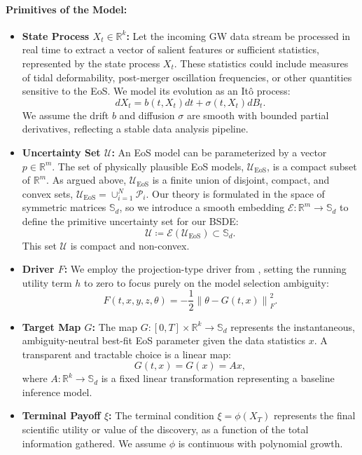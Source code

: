 \documentclass[12pt, letterpaper]{amsart}
\newcommand{\Ucal}{\mathcal{U}}
\newcommand{\Sd}{\mathbb{S}_d}
\newcommand{\R}{\mathbb{R}}
\newcommand{\norm}[1]{\left\lVert#1\right\rVert}
\theoremstyle{plain}
\theoremstyle{definition}
\theoremstyle{remark}
\numberwithin{equation}{section} %
\begin{document}
\paragraph{\textbf{Primitives of the Model:}}
\begin{itemize}
    \item \textbf{State Process $X_t \in \R^k$:} Let the incoming GW data stream be processed in real time to extract a vector of salient features or sufficient statistics, represented by the state process $X_t$. These statistics could include measures of tidal deformability, post-merger oscillation frequencies, or other quantities sensitive to the EoS. We model its evolution as an Itô process:
    \[ dX_t = b(t, X_t) dt + \sigma(t, X_t) dB_t. \]
    We assume the drift $b$ and diffusion $\sigma$ are smooth with bounded partial derivatives, reflecting a stable data analysis pipeline.

    \item \textbf{Uncertainty Set $\Ucal$:} An EoS model can be parameterized by a vector $p \in \R^m$. The set of physically plausible EoS models, \(\Ucal_{\text{EoS}}\), is a compact subset of $\R^m$. As argued above, \(\Ucal_{\text{EoS}}\) is a finite union of disjoint, compact, and convex sets, \(\Ucal_{\text{EoS}} = \cup_{i=1}^N \mathcal{P}_i\). Our theory is formulated in the space of symmetric matrices $\Sd$, so we introduce a smooth embedding \(\mathcal{E}: \R^m \to \Sd\) to define the primitive uncertainty set for our BSDE:
    \[ \Ucal \coloneqq \mathcal{E}(\Ucal_{\text{EoS}}) \subset \Sd. \]
    This set \(\Ucal\) is compact and non-convex.

    \item \textbf{Driver $F$:} We employ the projection-type driver from , setting the running utility term $h$ to zero to focus purely on the model selection ambiguity:
    \[ F(t, x, y, z, \theta) = -\frac{1}{2}\norm{\theta - G(t,x)}_F^2. \]

    \item \textbf{Target Map $G$:} The map $G: [0,T] \times \R^k \to \Sd$ represents the instantaneous, ambiguity-neutral best-fit EoS parameter given the data statistics $x$. A transparent and tractable choice is a linear map:
    \[ G(t,x) = G(x) = Ax, \]
    where $A: \R^k \to \Sd$ is a fixed linear transformation representing a baseline inference model.

    \item \textbf{Terminal Payoff $\xi$:} The terminal condition \(\xi = \phi(X_T)\) represents the final scientific utility or value of the discovery, as a function of the total information gathered. We assume $\phi$ is continuous with polynomial growth.
\end{itemize}
\end{document}
